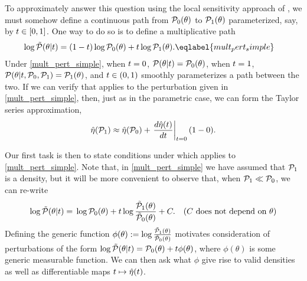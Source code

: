 To approximately answer this question using the local sensitivity approach of
, we must somehow define a continuous path from
$\mathcal{P}_{0}(\theta)$ to $\mathcal{P}_{1}(\theta)$ parameterized, say, by $t \in [0, 1]$. One
way to do so is to define a multiplicative path
%
\begin{align}
%
\log \ptil(\theta \vert \t) ={}&
    (1 - \t)\log \pbase(\theta) + \t \log \palt(\theta).
        \eqlabel{mult_pert_simple}
%
\end{align}
%
Under \eqref{mult_pert_simple}, when $t=0$, $\mathcal{P}(\theta \vert t) =
\mathcal{P}_{0}(\theta)$, when $t=1$, $\mathcal{P}(\theta \vert t, \mathcal{P}_{0}, \mathcal{P}_{1}) =
\mathcal{P}_{1}(\theta)$, and $t \in (0,1)$ smoothly parameterizes a path between the
two.  If we can verify that  applies to the perturbation
given in \eqref{mult_pert_simple}, then, just as in the parametric case, we can
form the Taylor series approximation,
%
\begin{align*}
%
\etaopt(\palt) \approx
    \etaopt(\pbase) + \fracat{d \etaopt(\t)}{d\t}{\t=0} (1 - 0).
%
\end{align*}

Our first task is then to state conditions under which 
applies to \eqref{mult_pert_simple}.  Note that, in \eqref{mult_pert_simple} we
have assumed that $\mathcal{P}_{1}$ is a density, but it will be more convenient to
observe that, when $\mathcal{P}_{1} \ll \mathcal{P}_{0}$, we can re-write
%
\begin{align*}
%
\log \ptil(\theta \vert \t) ={}&
    \log \pbase(\theta) +
        \t \log \frac{\palttil(\theta)}{\pbasetil(\theta)} +
        \const. & \constdesc{\theta}
%
\end{align*}
%
Defining the generic function $\phi(\theta) := \log
\frac{\tilde{\mathcal{P}}_{1}(\theta)}{\tilde{\mathcal{P}}_{0}(\theta)}$ motivates consideration of
perturbations of the form $\log \tilde{\mathcal{P}}(\theta \vert t) = \mathcal{P}_{0}(\theta) + t
\phi(\theta)$, where $\phi(\theta)$ is some generic measurable function. We can
then ask what $\phi$ give rise to valid densities as well as differentiable maps
$t \mapsto \hat\eta(t)$.


